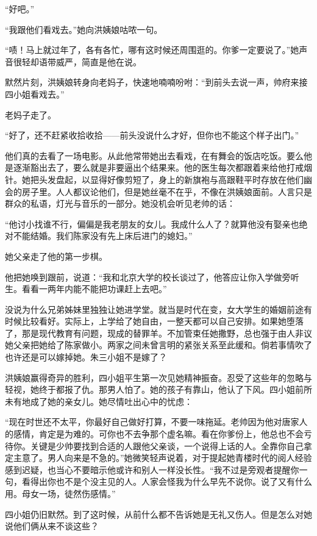 \par “好吧。”
\par “我跟他们看戏去。”她向洪姨娘咕哝一句。
\par “啧！马上就过年了，各有各忙，哪有这时候还周围逛的。你爹一定要说了。”她声音很轻却语带威严，简直是他在说。
\par 默然片刻，洪姨娘转身向老妈子，快速地喃喃吩咐：“到前头去说一声，帅府来接四小姐看戏去。”
\par 老妈子走了。
\par “好了，还不赶紧收拾收拾——前头没说什么才好，但你也不能这个样子出门。”
\par 他们真的去看了一场电影。从此他常带她出去看戏，在有舞会的饭店吃饭。要么他是逐渐豁出去了，要么就是非要逼出个结果来。他的医生每次都跟着来给他打戒烟针。她把头发盘起，以显得好像剪短了，身上的新旗袍与高跟鞋平时存放在他们幽会的房子里。人人都议论他们，但是她丝毫不在乎，不像在洪姨娘面前。人言只是群众的私语，灯光与音乐的一部分。她没机会听见老帅的话：
\par “他讨小找谁不行，偏偏是我老朋友的女儿。我成什么人了？就算他没有娶亲也绝对不能结婚。我们陈家没有先上床后进门的媳妇。”
\par 她父亲走了他的第一步棋。
\par 他把她唤到跟前，说道：“我和北京大学的校长谈过了，他答应让你入学做旁听生。看看一两年内能不能把功课赶上去吧。”
\par 没说为什么兄弟姊妹里独独让她进学堂。就当是时代在变，女大学生的婚姻前途有时候比较看好。实际上，上学给了她自由，一整天都可以自己安排。如果她堕落了，那是现代教育有问题，现成的替罪羊。不加管束任她撒野，总也强于由人非议她父亲把她给了陈家做小。两家之间未曾言明的紧张关系至此缓和。倘若事情吹了也许还是可以嫁掉她。朱三小姐不是嫁了？
\par 洪姨娘赢得奇异的胜利，四小姐平生第一次见她精神振奋。忍受了这些年的忽略与轻视，她终于都报了仇。那男人怕了。她的孩子有靠山，他认了下风。四小姐前所未有地成了她的亲女儿。她尽情吐出心中的忧虑：
\par “现在时世还不太平，你最好自己做好打算，不要一味拖延。老帅因为他对唐家人的感情，肯定是为难的。可你也不去争那个虚名嘛。看在你爹份上，他总也不会亏待你。关键是少帅要找到合适的人跟他父亲谈，一个说得上话的人。全靠你自己拿定主意了。男人向来是不急的。”她微笑轻声说着，对于提起她青楼时代的阅人经验感到迟疑，也当心不要暗示他或许和别人一样没长性。“我不过是旁观者提醒你一句，看得出你也不是个没主见的人。人家会怪我为什么早先不说你。说了又有什么用。母女一场，徒然伤感情。”
\par 四小姐仍旧默然。到了这时候，从前什么都不告诉她是无礼又伤人。但是怎么对她说他们俩从来不谈这些？
